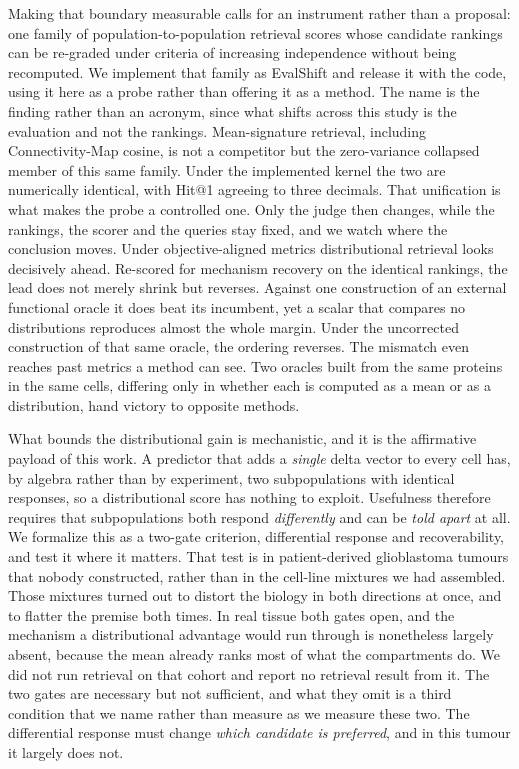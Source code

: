 \documentclass[11pt,letterpaper]{article}
\begin{document}
Making that boundary measurable calls for an instrument rather than a proposal: one family of population-to-population retrieval scores whose candidate rankings can be re-graded under criteria of increasing independence without being recomputed. We implement that family as EvalShift and release it with the code, using it here as a probe rather than offering it as a method. The name is the finding rather than an acronym, since what shifts across this study is the evaluation and not the rankings. Mean-signature retrieval, including Connectivity-Map cosine, is not a competitor but the zero-variance collapsed member of this same family. Under the implemented kernel the two are numerically identical, with Hit@1 agreeing to three decimals. That unification is what makes the probe a controlled one. Only the judge then changes, while the rankings, the scorer and the queries stay fixed, and we watch where the conclusion moves. Under objective-aligned metrics distributional retrieval looks decisively ahead. Re-scored for mechanism recovery on the identical rankings, the lead does not merely shrink but reverses. Against one construction of an external functional oracle it does beat its incumbent, yet a scalar that compares no distributions reproduces almost the whole margin. Under the uncorrected construction of that same oracle, the ordering reverses. The mismatch even reaches past metrics a method can see. Two oracles built from the same proteins in the same cells, differing only in whether each is computed as a mean or as a distribution, hand victory to opposite methods.

What bounds the distributional gain is mechanistic, and it is the affirmative payload of this work. A predictor that adds a \emph{single} delta vector to every cell has, by algebra rather than by experiment, two subpopulations with identical responses, so a distributional score has nothing to exploit. Usefulness therefore requires that subpopulations both respond \emph{differently} and can be \emph{told apart} at all. We formalize this as a two-gate criterion, differential response and recoverability, and test it where it matters. That test is in patient-derived glioblastoma tumours that nobody constructed, rather than in the cell-line mixtures we had assembled. Those mixtures turned out to distort the biology in both directions at once, and to flatter the premise both times. In real tissue both gates open, and the mechanism a distributional advantage would run through is nonetheless largely absent, because the mean already ranks most of what the compartments do. We did not run retrieval on that cohort and report no retrieval result from it. The two gates are necessary but not sufficient, and what they omit is a third condition that we name rather than measure as we measure these two. The differential response must change \emph{which candidate is preferred}, and in this tumour it largely does not.
\end{document}
